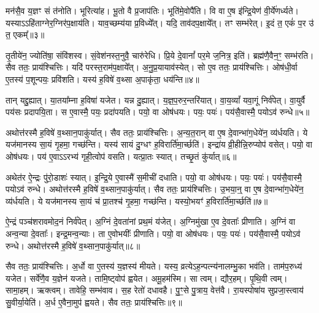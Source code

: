 मन॑सै॒व य॒ज्ञꣳ सं त॑नोति।
भूरित्या॑ह।
भू॒तो वै प्र॒जा\-प॑तिः।
भूति॑मे॒वोपै॑ति।
वि वा ए॒ष इ॑न्द्रि॒येण॑ वी॒र्ये॑णर्ध्यते।
यस्याऽऽहि॑ताग्नेर॒ग्निर॑प॒क्षाय॑ति।
याव॒च्छम्य॑या प्र॒विध्ये᳚त्।
यदि॒ ताव॑दप॒क्षाये᳚त्।
तꣳ सम्भ॑रेत्।
इ॒दं त॒ एकं॑ प॒र उ॑ त॒ एकम्᳚॥३॥\ip

तृ॒तीये॑न॒ ज्योति॑षा॒ संवि॑शस्व।
सं॒वेश॑नस्त॒नुवै॒ चारु॑रेधि।
प्रि॒ये दे॒वानां᳚ पर॒मे ज॒नित्र॒ इति॑।
ब्रह्म॑णै॒वैन॒ꣳ॒ सम्भ॑रति।
सैव ततः॒ प्राय॑श्चित्तिः।
यदि॑ परस्त॒राम॑प॒क्षाये᳚त्।
अ॒नु॒प्र॒यायाव॑स्येत्।
सो ए॒व ततः॒ प्राय॑श्चित्तिः।
ओष॑धी॒र्वा ए॒तस्य॑ प॒शून्पयः॒ प्रवि॑शति।
यस्य॑ ह॒विषे॑ व॒थ्सा अ॒पाकृ॑ता॒ धय॑न्ति॥४॥\ip

तान् यद्दु॒ह्यात्।
या॒तया᳚म्ना ह॒विषा॑ यजेत।
यन्न दु॒ह्यात्।
य॒ज्ञ॒प॒रुर॒न्तरि॑यात्।
वा॒य॒व्यां᳚ यवा॒गूं निर्व॑पेत्।
वा॒युर्वै पय॑सः प्रदापयि॒ता।
स ए॒वास्मै॒ पयः॒ प्रदा॑पयति।
पयो॒ वा ओष॑धयः।
पयः॒ पयः॑।
पय॑सै॒वास्मै॒ पयो\-ऽव॑ रुन्धे॥५॥\ip

अथोत्त॑रस्मै ह॒विषे॑ व॒थ्सान॒पाकु॑र्यात्।
सैव ततः॒ प्राय॑श्चित्तिः।
अ॒न्य॒त॒रान् वा ए॒ष दे॒वान्भा॑ग॒धेये॑न॒ व्य॑र्धयति।
ये यज॑मानस्य सा॒यं गृ॒हमा॒ गच्छ॑न्ति।
यस्य॑ सायं दु॒ग्धꣳ ह॒विरार्ति॑मा॒र्च्छति॑।
इन्द्रा॑य व्री॒हीन्नि॒रुप्योप॑ वसेत्।
पयो॒ वा ओष॑धयः।
पय॑ ए॒वाऽऽरभ्य॑ गृही॒त्वोप॑ वसति।
यत्प्रा॒तः स्यात्।
तच्छृ॒तं कु॑र्यात्॥६॥\ip

अथेत॑र ऐ॒न्द्रः पु॑रो॒डाशः॑ स्यात्।
इ॒न्द्रि॒ये ए॒वास्मै॑ स॒मीची॑ दधाति।
पयो॒ वा ओष॑धयः।
पयः॒ पयः॑।
पय॑सै॒वास्मै॒ पयो\-ऽव॑ रुन्धे।
अथोत्त॑रस्मै ह॒विषे॑ व॒थ्सान॒पाकु॑र्यात्।
सैव ततः॒ प्राय॑श्चित्तिः।
उ॒भया॒न्॒ वा ए॒ष दे॒वान्भा॑ग॒धेये॑न॒ व्य॑र्धयति।
ये यज॑मानस्य सा॒यं च॑ प्रा॒तश्च॑ गृ॒हमा॒ गच्छ॑न्ति।
यस्यो॒भयꣳ॑ ह॒विरार्ति॑मा॒र्च्छति॑॥७॥\ip

ऐ॒न्द्रं पञ्च॑शरावमोद॒नं निर्व॑पेत्।
अ॒ग्निं दे॒वता॑नां प्रथ॒मं य॑जेत्।
अ॒ग्निमु॑खा ए॒व दे॒वताः᳚ प्रीणाति।
अ॒ग्निं वा अन्व॒न्या दे॒वताः᳚।
इन्द्र॒मन्व॒न्याः।
ता ए॒वोभयीः᳚ प्रीणाति।
पयो॒ वा ओष॑धयः।
पयः॒ पयः॑।
पय॑सै॒वास्मै॒ पयो\-ऽव॑ रुन्धे।
अथोत्त॑रस्मै ह॒विषे॑ व॒थ्सान॒पाकु॑र्यात्॥८॥\ip

सैव ततः॒ प्राय॑श्चित्तिः।
अ॒र्धो वा ए॒तस्य॑ य॒ज्ञस्य॑ मीयते।
यस्य॒ व्रत्ये\-ऽह॒न्पत्न्य॑नालम्भु॒का भव॑ति।
ताम॑प॒रुध्य॑ यजेत।
सर्वे॑णै॒व य॒ज्ञेन॑ यजते।
तामि॒ष्ट्वोप॑ ह्वयेत।
अमू॒हम॑स्मि।
सा त्वम्।
द्यौर॒हम्।
पृ॒थि॒वी त्वम्।
सामा॒हम्।
ऋक्त्वम्।
तावेहि॒ सम्भ॑वाव।
स॒ह रेतो॑ दधावहै।
पु॒ꣳ॒से पु॒त्राय॒ वेत्त॑वै।
रा॒यस्पोषा॑य सुप्रजा॒स्त्वाय॑ सु॒वीर्या॒येति॑।
अ॒र्ध ए॒वैना॒मुप॑ ह्वयते।
सैव ततः॒ प्राय॑श्चित्तिः॥९॥\ip\anuvakamend[द॒धा॒ति॒ य॒ज्ञ उ॑त॒ एक॒न्धय॑न्ति रुन्धे कुर्यादा॒र्च्छत्य॒पाकु॑र्यात्पृथि॒वी त्वम॒ष्टौ च॑ (सर्वा॒न्॒ वि वै यदि॑ परस्त॒रामोष॑धीरन्यत॒रानु॒भया॑न॒र्धो वै॥)]

